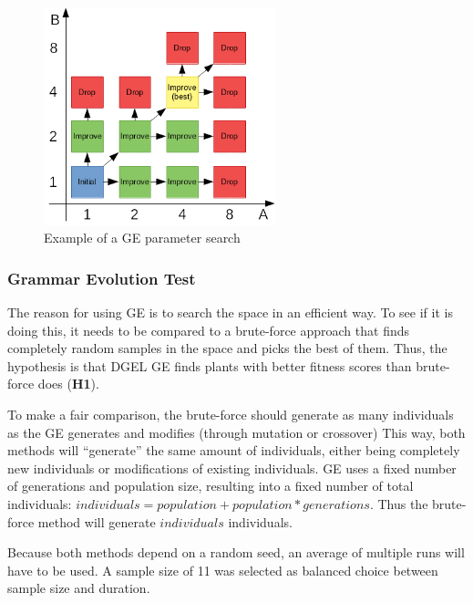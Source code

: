 \begin{figure}
    \centering
    \includegraphics[width=0.6\textwidth]{figures/parameter-search}
    \caption{Example of a GE parameter search}
    \label{fig:parameter-search}
\end{figure}

\subsubsection{Grammar Evolution Test}
The reason for using GE is to search the space in an efficient way.
To see if it is doing this, it needs to be compared to a brute-force approach that finds completely random samples in the space and picks the best of them.
Thus, the hypothesis is that DGEL GE finds plants with better fitness scores than brute-force does (\textbf{H1}).

To make a fair comparison, the brute-force should generate as many individuals as the GE generates and modifies (through mutation or crossover)
This way, both methods will ``generate'' the same amount of individuals, either being completely new individuals or modifications of existing individuals.
GE uses a fixed number of generations and population size, resulting into a fixed number of total individuals: $individuals = population + population * generations$.
Thus the brute-force method will generate $individuals$ individuals.

Because both methods depend on a random seed, an average of multiple runs will have to be used.
A sample size of 11 was selected as balanced choice between sample size and duration.

